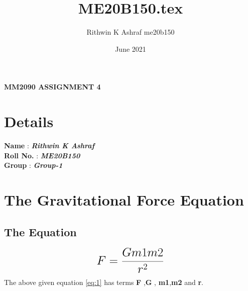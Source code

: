 \documentclass{article}
\title{ME20B150.tex}
\author{Rithwin K Ashraf me20b150}
\date{June 2021}
\begin{document}
\begin{center}
	{\LARGE {\textbf {MM2090 ASSIGNMENT 4}}}
\end{center}

\section{Details}
\textbf {Name} : \textbf{\textit {Rithwin K Ashraf}}\\
\textbf {Roll No.} : \textbf{\textit {ME20B150}}\\
\textbf {Group} : \textbf{\textit {Group-1}}
\section{The Gravitational Force Equation}
\subsection{The Equation}
\begin{equation}
	{\LARGE{\textbf{$F =\frac{Gm1m2}{{r^2}}$}}}
	\label{eq:1}
\end{equation}
{\normalsize {The above given equation \ref{eq:1}  has terms \textbf{F} ,\textbf{G} , \textbf{m1},\textbf{m2} and \textbf{r}.}}
\end{document}
